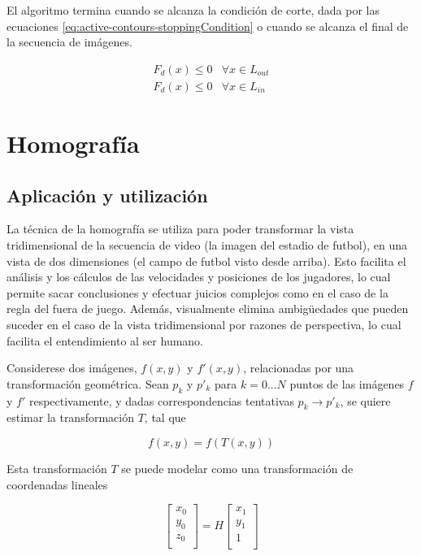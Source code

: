 \documentclass[a4paper,10pt]{article}
\begin{document}
El algoritmo termina cuando se alcanza la condición de corte, dada por las
ecuaciones \ref{eq:active-contours-stoppingCondition} o cuando se alcanza el
final de la secuencia de imágenes.

\begin{equation}
\label{eq:active-contours-stoppingCondition}
    \begin{array}{ll}
        F_{d}(x) \leq 0 & \forall x \in L_{out}\\
        F_{d}(x) \leq 0 & \forall x \in L_{in}
    \end{array}
\end{equation}

\section{Homografía}

\subsection{Aplicación y utilización}

La técnica de la homografía se utiliza para poder transformar la vista
tridimensional de la secuencia de video (la imagen del estadio de futbol), en
una vista de dos dimensiones (el campo de futbol visto desde arriba). Esto
facilita el análisis y los cálculos de las velocidades y posiciones de los
jugadores, lo cual permite sacar conclusiones y efectuar juicios complejos como
en el caso de la regla del fuera de juego. Además, visualmente elimina
ambigüedades que pueden suceder en el caso de la vista tridimensional por
razones de perspectiva, lo cual facilita el entendimiento al ser humano.

Considerese dos imágenes, $f(x,y)$ y $f'(x,y)$, relacionadas por una transformación geométrica. Sean $p_{k}$ y $p'_{k}$ para $k = 0 ... N$ puntos de las imágenes
$f$ y $f'$ respectivamente, y dadas correspondencias tentativas $p_{k} \to p'_{k}$, se quiere estimar la transformación $T$, tal que

\begin{equation}
    f(x,y) = f(T(x,y))
\end{equation}

Esta transformación $T$ se puede modelar como una transformación de coordenadas lineales

\begin{equation}
    \begin{bmatrix}
        x_{0} \\
        y_{0} \\
        z_{0} \\
    \end{bmatrix}
    = H
    \begin{bmatrix}
        x_{1} \\
        y_{1} \\
        1 \\
    \end{bmatrix}
\end{equation}
\end{document}
